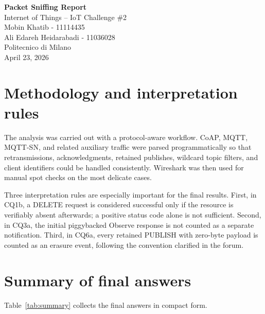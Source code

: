 \documentclass[11pt,a4paper]{article}
\begin{document}
\begin{center}
    {\LARGE \textbf{Packet Sniffing Report}}\\[0.4em]
    {\large Internet of Things -- IoT Challenge \#2}\\[1.2em]
    Mobin Khatib - 11114435\\
    Ali Edareh Heidarabadi - 11036028\\[0.6em]
    Politecnico di Milano\\[0.6em]
    April 23, 2026
\end{center}

\vspace{1em}

\begin{abstract}
This report presents the solution to Part 1 of the challenge, namely questions CQ1--CQ8 on the packet captures \texttt{A.pcapng} and \texttt{B.pcapng}. Malformed packets were ignored, consistently with the assignment statement. The final counts were obtained through script-based analysis and then checked manually in Wireshark, with particular attention to CoAP request--response matching, Observe notifications, MQTT-SN decoding on UDP port 1885, wildcard subscriptions, retained-message deletions, and topic-depth extraction for local-broker publish traffic.
\end{abstract}

\section*{Methodology and interpretation rules}
The analysis was carried out with a protocol-aware workflow. CoAP, MQTT, MQTT-SN, and related auxiliary traffic were parsed programmatically so that retransmissions, acknowledgments, retained publishes, wildcard topic filters, and client identifiers could be handled consistently. Wireshark was then used for manual spot checks on the most delicate cases.

Three interpretation rules are especially important for the final results. First, in CQ1b, a DELETE request is considered successful only if the resource is verifiably absent afterwards; a positive status code alone is not sufficient. Second, in CQ3a, the initial piggybacked Observe response is not counted as a separate notification. Third, in CQ6a, every retained PUBLISH with zero-byte payload is counted as an erasure event, following the convention clarified in the forum.

\section*{Summary of final answers}
Table~\ref{tab:summary} collects the final answers in compact form.
\end{document}
